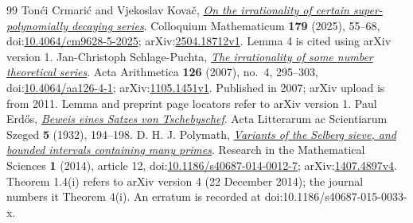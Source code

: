 \documentclass[11pt]{article}
\begin{document}
\begin{thebibliography}{99}
 Ton\'{c}i Crmari\'{c} and Vjekoslav Kova\v{c}, \href{https://arxiv.org/abs/2504.18712v1}{\emph{On the irrationality of certain super-polynomially decaying series}}.
  Colloquium Mathematicum \textbf{179} (2025), 55--68, doi:\href{https://doi.org/10.4064/cm9628-5-2025}{10.4064/cm9628-5-2025}; arXiv:\href{https://arxiv.org/abs/2504.18712v1}{2504.18712v1}. Lemma 4 is cited using arXiv version 1.
 Jan-Christoph Schlage-Puchta, \href{https://arxiv.org/abs/1105.1451v1}{\emph{The irrationality of some number theoretical series}}.
  Acta Arithmetica \textbf{126} (2007), no.~4, 295--303, doi:\href{https://doi.org/10.4064/aa126-4-1}{10.4064/aa126-4-1}; arXiv:\href{https://arxiv.org/abs/1105.1451v1}{1105.1451v1}. Published in 2007; arXiv upload is from 2011. Lemma and preprint page locators refer to arXiv version 1.
 Paul Erd\H{o}s, \href{https://users.renyi.hu/~p_erdos/1932-01.pdf}{\emph{Beweis eines Satzes von Tschebyschef}}.
  Acta Litterarum ac Scientiarum Szeged \textbf{5} (1932), 194--198.
 {D. H. J. Polymath}, \href{https://arxiv.org/abs/1407.4897v4}{\emph{Variants of the Selberg sieve, and bounded intervals containing many primes}}.
  Research in the Mathematical Sciences \textbf{1} (2014), article 12, doi:\href{https://doi.org/10.1186/s40687-014-0012-7}{10.1186/s40687-014-0012-7}; arXiv:\href{https://arxiv.org/abs/1407.4897v4}{1407.4897v4}. Theorem 1.4(i) refers to arXiv version 4 (22 December 2014); the journal numbers it Theorem 4(i). An erratum is recorded at doi:10.1186/s40687-015-0033-x.
\end{thebibliography}
\end{document}
